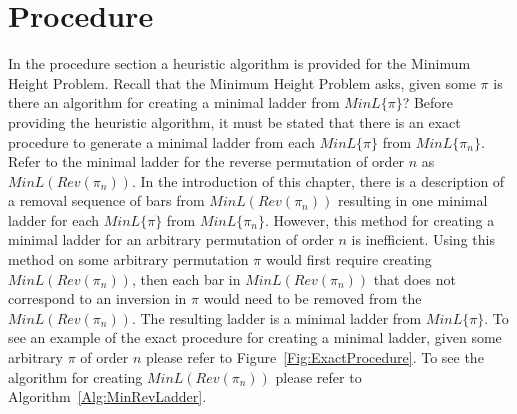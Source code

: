\section{Procedure}

In the procedure section a heuristic algorithm is provided for the Minimum Height Problem. Recall that the 
Minimum Height Problem asks, given some $\pi$ is there an algorithm for creating a minimal ladder 
from $MinL\{\pi\}$? Before providing the heuristic algorithm, it must be stated that there is an exact  
procedure to generate a minimal ladder from each $MinL\{\pi\}$ from $MinL\{\pi_{n}\}$. Refer to the minimal ladder for the reverse permutation 
of order $n$ as $MinL(Rev(\pi_{n}))$. In the introduction of this chapter, there 
is a description of a removal sequence of bars from $MinL(Rev(\pi_{n}))$ resulting in one  
minimal ladder for each $MinL\{\pi\}$ from $MinL\{\pi_{n}\}$. However, this method for creating a minimal ladder for an arbitrary 
permutation of order $n$ is inefficient. 
Using this method on some arbitrary permutation $\pi$ would first require creating $MinL(Rev(\pi_{n}))$, then each bar in $MinL(Rev(\pi_{n}))$ that 
does not correspond to an inversion in $\pi$ would need to be removed from the $MinL(Rev(\pi_{n}))$. 
The resulting ladder is a minimal ladder from $MinL\{\pi\}$. To see an example of the exact procedure 
for creating a minimal ladder, given some arbitrary $\pi$ of order $n$ please refer to Figure~\ref{Fig:ExactProcedure}. To see 
the algorithm for creating $MinL(Rev(\pi_{n}))$ please refer to Algorithm~\ref{Alg:MinRevLadder}.
